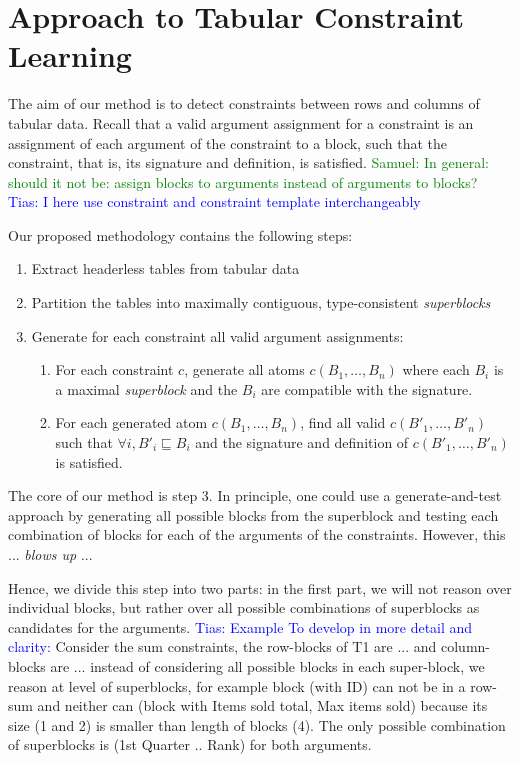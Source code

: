 \documentclass{IEEEtran}
\newcommand{\samuel}[1]{\textcolor{green}{{\sc Samuel:} #1}\xspace}
\newcommand{\tias}[1]{\textcolor{blue}{{\sc Tias:} #1}\xspace}
\theoremstyle{definition}
\begin{document}

\newcommand{\tcl}{Tabular Constraint Learning}
\section{Approach to Tabular Constraint Learning}\label{sec:approach}
The aim of our method is to detect constraints between rows and columns of tabular data. Recall that a valid argument assignment for a constraint is an assignment of each argument of the constraint to a block, such that the constraint, that is, its signature and definition, is satisfied.
\samuel{In general: should it not be: assign blocks to arguments instead of arguments to blocks?}
\tias{I here use constraint and constraint template interchangeably}

Our proposed methodology contains the following steps:
\begin{enumerate}
\item Extract headerless tables from tabular data
\item Partition the tables into maximally contiguous, type-consistent \textit{superblocks}
\item Generate for each constraint all valid argument assignments:
\begin{enumerate}
\item For each constraint $c$, generate all atoms $c(B_1, \ldots ,B_n)$ where each $B_i$ is a maximal \textit{superblock} and the $B_i$ are compatible with the signature.
\item For each generated atom $c(B_1, \ldots ,B_n)$, find all valid $c(B'_1, \ldots, B'_n)$ such that $\forall i, B'_i \sqsubseteq B_i$ and the signature and definition of $c(B'_1, \ldots, B'_n)$ is satisfied.
\end{enumerate}
\end{enumerate}

The core of our method is step 3. In principle, one could use a generate-and-test approach by generating all possible blocks from the superblock and testing each combination of blocks for each of the arguments of the constraints. However, this ... \textit{blows up} ...

Hence, we divide this step into two parts: in the first part, we will not reason over individual blocks, but rather over all possible combinations of superblocks as candidates for the arguments.
\tias{Example To develop in more detail and clarity:}
Consider the sum constraints, the row-blocks of T1 are ... and column-blocks are ... instead of considering all possible blocks in each super-block, we reason at level of superblocks, for example block (with ID) can not be in a row-sum and neither can (block with Items sold total, Max items sold) because its size (1 and 2) is smaller than length of blocks (4). The only possible combination of superblocks is (1st Quarter .. Rank) for both arguments.
\end{document}
